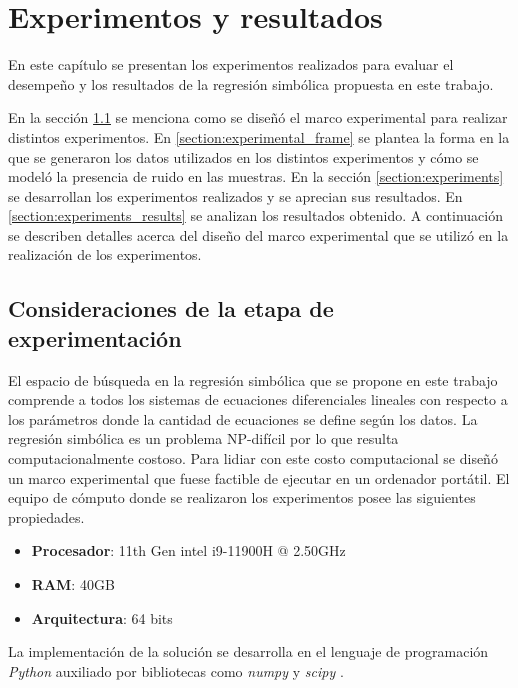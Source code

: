 \chapter{Experimentos y resultados}\label{chapter:results}

En este capítulo se presentan los experimentos realizados para evaluar el desempeño y los resultados de la regresión simbólica propuesta en este trabajo.

En la sección \ref{section:experimental_considerations} se menciona como se diseñó el marco experimental para realizar distintos experimentos. En \ref{section:experimental_frame} se plantea la forma en la que se generaron los datos utilizados en los distintos experimentos y cómo se modeló la presencia de ruido en las muestras. En la sección \ref{section:experiments} se desarrollan los experimentos realizados y se aprecian sus resultados. En \ref{section:experiments_results} se analizan los resultados obtenido. A continuación se describen detalles acerca del diseño del marco experimental que se utilizó en la realización de los experimentos.

\section{Consideraciones de la etapa de experimentación}\label{section:experimental_considerations}

El espacio de búsqueda en la regresión simbólica que se propone en este trabajo comprende a todos los sistemas de ecuaciones diferenciales lineales con respecto a los parámetros donde la cantidad de ecuaciones se define según los datos. La regresión simbólica es un problema NP-difícil por lo que resulta computacionalmente costoso. Para lidiar con este costo computacional se diseñó un marco experimental que fuese factible de ejecutar en un ordenador portátil. El equipo de cómputo donde se realizaron los experimentos posee las siguientes propiedades.

\begin{itemize}
    \item \textbf{Procesador}: 11th Gen intel i9-11900H @ 2.50GHz
    \item \textbf{RAM}: 40GB
    \item \textbf{Arquitectura}: 64 bits
\end{itemize}

La implementación de la solución se desarrolla en el lenguaje de programación \emph{Python} auxiliado por bibliotecas como \emph{numpy} \cite{harris2020array} y \emph{scipy} \cite{2020SciPy-NMeth}.

